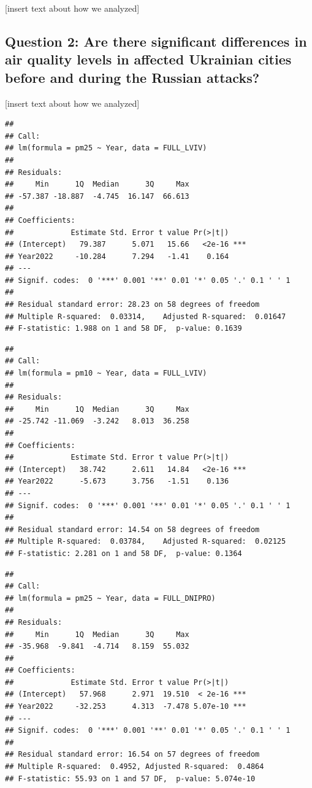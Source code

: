\documentclass[
  12pt,
]{article}
\begin{document}
{[}insert text about how we analyzed{]}

\hypertarget{question-2-are-there-significant-differences-in-air-quality-levels-in-affected-ukrainian-cities-before-and-during-the-russian-attacks}{%
\subsection{Question 2: Are there significant differences in air quality
levels in affected Ukrainian cities before and during the Russian
attacks?}\label{question-2-are-there-significant-differences-in-air-quality-levels-in-affected-ukrainian-cities-before-and-during-the-russian-attacks}}

{[}insert text about how we analyzed{]}

\begin{verbatim}
## 
## Call:
## lm(formula = pm25 ~ Year, data = FULL_LVIV)
## 
## Residuals:
##     Min      1Q  Median      3Q     Max 
## -57.387 -18.887  -4.745  16.147  66.613 
## 
## Coefficients:
##             Estimate Std. Error t value Pr(>|t|)    
## (Intercept)   79.387      5.071   15.66   <2e-16 ***
## Year2022     -10.284      7.294   -1.41    0.164    
## ---
## Signif. codes:  0 '***' 0.001 '**' 0.01 '*' 0.05 '.' 0.1 ' ' 1
## 
## Residual standard error: 28.23 on 58 degrees of freedom
## Multiple R-squared:  0.03314,    Adjusted R-squared:  0.01647 
## F-statistic: 1.988 on 1 and 58 DF,  p-value: 0.1639
\end{verbatim}

\begin{verbatim}
## 
## Call:
## lm(formula = pm10 ~ Year, data = FULL_LVIV)
## 
## Residuals:
##     Min      1Q  Median      3Q     Max 
## -25.742 -11.069  -3.242   8.013  36.258 
## 
## Coefficients:
##             Estimate Std. Error t value Pr(>|t|)    
## (Intercept)   38.742      2.611   14.84   <2e-16 ***
## Year2022      -5.673      3.756   -1.51    0.136    
## ---
## Signif. codes:  0 '***' 0.001 '**' 0.01 '*' 0.05 '.' 0.1 ' ' 1
## 
## Residual standard error: 14.54 on 58 degrees of freedom
## Multiple R-squared:  0.03784,    Adjusted R-squared:  0.02125 
## F-statistic: 2.281 on 1 and 58 DF,  p-value: 0.1364
\end{verbatim}

\begin{verbatim}
## 
## Call:
## lm(formula = pm25 ~ Year, data = FULL_DNIPRO)
## 
## Residuals:
##     Min      1Q  Median      3Q     Max 
## -35.968  -9.841  -4.714   8.159  55.032 
## 
## Coefficients:
##             Estimate Std. Error t value Pr(>|t|)    
## (Intercept)   57.968      2.971  19.510  < 2e-16 ***
## Year2022     -32.253      4.313  -7.478 5.07e-10 ***
## ---
## Signif. codes:  0 '***' 0.001 '**' 0.01 '*' 0.05 '.' 0.1 ' ' 1
## 
## Residual standard error: 16.54 on 57 degrees of freedom
## Multiple R-squared:  0.4952, Adjusted R-squared:  0.4864 
## F-statistic: 55.93 on 1 and 57 DF,  p-value: 5.074e-10
\end{verbatim}
\end{document}

